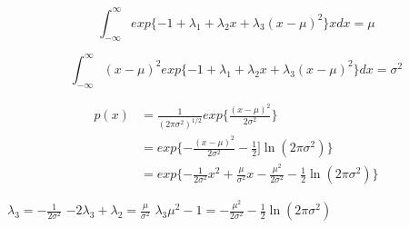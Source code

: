 $$
\int_{-\infty}^\infty  exp\{-1+\lambda_1 + \lambda_2x + \lambda_3(x-\mu)^2\} xdx = \mu
$$

$$
\int_{-\infty}^\infty (x - \mu)^2 exp\{-1+\lambda_1 + \lambda_2x + \lambda_3(x-\mu)^2\}dx = \sigma^2
$$

$$
\begin{aligned}
  p(x) &= \frac{1}{(2\pi \sigma^2)^{1/2}}exp\{\frac{(x-\mu)^2}{2\sigma ^2}\}\\
& = exp\{-\frac{(x-\mu)^2}{2\sigma^2} - \frac{1}{2}]\ln (2\pi \sigma^2)\}\\
& = exp\{-\frac{1}{2\sigma^2}x^2 + \frac{\mu}{\sigma^2}x - \frac{\mu ^ 2}{2\sigma^2} - \frac{1}{2}\ln (2\pi \sigma^2)\}
\end{aligned}
$$

$\lambda_3 = -\frac{1}{2\sigma^2}$
$-2\lambda_3 + \lambda_2 = \frac{\mu}{\sigma^2}$
$\lambda_3 \mu^2 - 1 = -\frac{\mu^2}{2\sigma^2}-\frac{1}{2}\ln (2\pi \sigma^2)$
